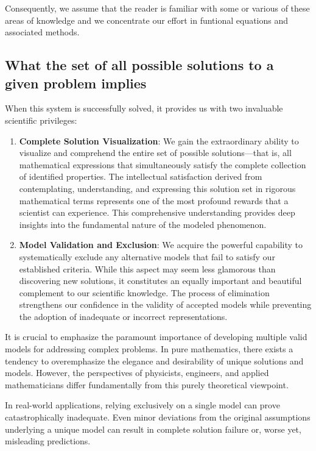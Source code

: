 Consequently, we assume that the reader is familiar with some or various of these areas of knowledge and we concentrate our effort in funtional equations and associated methods.

\subsection{What the set of all possible solutions to a given problem implies}
When this system is successfully solved, it provides us with two invaluable scientific privileges:
\begin{enumerate}
\item \textbf{Complete Solution Visualization}: We gain the extraordinary ability to visualize and comprehend the entire set of possible solutions—that is, all mathematical expressions that simultaneously satisfy the complete collection of identified properties. The intellectual satisfaction derived from contemplating, understanding, and expressing this solution set in rigorous mathematical terms represents one of the most profound rewards that a scientist can experience. This comprehensive understanding provides deep insights into the fundamental nature of the modeled phenomenon.

\item \textbf{Model Validation and Exclusion}: We acquire the powerful capability to systematically exclude any alternative models that fail to satisfy our established criteria. While this aspect may seem less glamorous than discovering new solutions, it constitutes an equally important and beautiful complement to our scientific knowledge. The process of elimination strengthens our confidence in the validity of accepted models while preventing the adoption of inadequate or incorrect representations.
\end{enumerate}

It is crucial to emphasize the paramount importance of developing multiple valid models for addressing complex problems. In pure mathematics, there exists a tendency to overemphasize the elegance and desirability of unique solutions and models. However, the perspectives of physicists, engineers, and applied mathematicians differ fundamentally from this purely theoretical viewpoint.

In real-world applications, relying exclusively on a single model can prove catastrophically inadequate. Even minor deviations from the original assumptions underlying a unique model can result in complete solution failure or, worse yet, misleading predictions.

